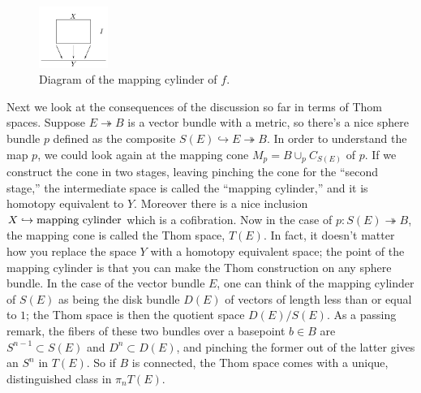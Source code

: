 \documentclass{article}
\newcommand{\into}{\hookrightarrow}
\newcommand{\onto}{\twoheadrightarrow}
\begin{document}
\begin{figure}
\centering\includegraphics[width=0.2\textwidth]{figures/fig7.pdf}
\caption{\small Diagram of the mapping cylinder of $f$.}
\end{figure} %
Next we look at the consequences of the discussion so far in terms of Thom spaces.  Suppose $E \onto B$ is a vector bundle with a metric, so there's a nice sphere bundle $p$ defined as the composite $S(E) \into E \onto B$.  In order to understand the map $p$, we could look again at the mapping cone $M_p = B \cup_p C_{S(E)}$ of $p$.  If we construct the cone in two stages, leaving pinching the cone for the ``second stage,'' the intermediate space is called the ``mapping cylinder,'' and it is homotopy equivalent to $Y$.  Moreover there is a nice inclusion $X \into \hbox{mapping cylinder}$ which is a cofibration.  Now in the case of $p: S(E) \onto B$, the mapping cone is called the Thom space, $T(E)$.  In fact, it doesn't matter how you replace the space $Y$ with a homotopy equivalent space; the point of the mapping cylinder is that you can make the Thom construction on any sphere bundle.  In the case of the vector bundle $E$, one can think of the mapping cylinder of $S(E)$ as being the disk bundle $D(E)$ of vectors of length less than or equal to $1$; the Thom space is then the quotient space $D(E) / S(E)$.  As a passing remark, the fibers of these two bundles over a basepoint $b \in B$ are $S^{n-1} \subset S(E)$ and $D^n \subset D(E)$, and pinching the former out of the latter gives an $S^n$ in $T(E)$.  So if $B$ is connected, the Thom space comes with a unique, distinguished class in $\pi_n T(E)$.
\end{document}
